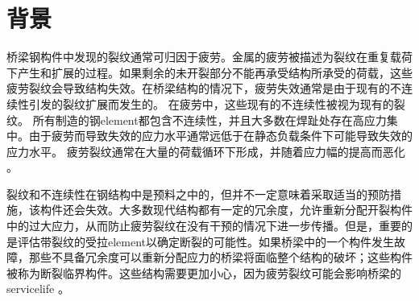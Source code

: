 \section{背景}
桥梁钢构件中发现的裂纹通常可归因于疲劳。金属的疲劳被描述为裂纹在重复载荷下产生和扩展的过程。如果剩余的未开裂部分不能再承受结构所承受的荷载，这些疲劳裂纹会导致结构失效。在桥梁结构的情况下，疲劳失效通常是由于现有的不连续性引发的裂纹扩展而发生的。 在疲劳中，这些现有的不连续性被视为现有的裂纹。 所有制造的钢\gls*{element}都包含不连续性，并且大多数在焊趾处存在高应力集中。由于疲劳而导致失效的应力水平通常远低于在静态负载条件下可能导致失效的应力水平。 疲劳裂纹通常在大量的荷载循环下形成，并随着应力幅的提高而恶化 \cite{fisher1998f}。

裂纹和不连续性在钢结构中是预料之中的，但并不一定意味着采取适当的预防措施，该构件还会失效。大多数现代结构都有一定的冗余度，允许重新分配开裂构件中的过大应力，从而防止疲劳裂纹在没有干预的情况下进一步传播。但是，重要的是评估带裂纹的受拉\gls*{element}以确定断裂的可能性。如果桥梁中的一个构件发生故障，那些不具备冗余度可以重新分配应力的桥梁将面临整个结构的破坏；这些构件被称为断裂临界构件。这些结构需要更加小心，因为疲劳裂纹可能会影响桥梁的\gls*{servicelife} \cite{fisher1998f}。

